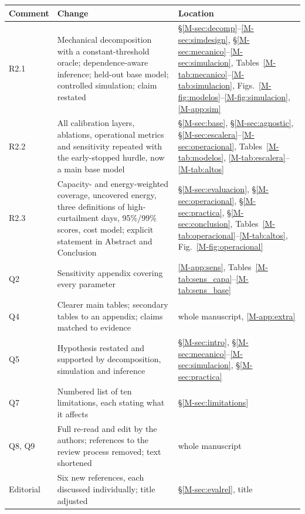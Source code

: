 \documentclass[11pt,a4paper]{article}
\begin{document}
\begin{center}
\small
\begin{tabularx}{\textwidth}{l >{\raggedright\arraybackslash}X >{\raggedright\arraybackslash}p{}}
\toprule
Comment & Change & Location \\
\midrule
R2.1 & Mechanical decomposition with a constant-threshold oracle; dependence-aware inference; held-out base model; controlled simulation; claim restated & \S\ref{M-sec:decomp}--\ref{M-sec:simdesign}, \S\ref{M-sec:mecanico}--\ref{M-sec:simulacion}, Tables~\ref{M-tab:mecanico}--\ref{M-tab:simulacion}, Figs.~\ref{M-fig:modelos}--\ref{M-fig:simulacion}, \ref{M-app:sim} \\
R2.2 & All calibration layers, ablations, operational metrics and sensitivity repeated with the early-stopped hurdle, now a main base model & \S\ref{M-sec:base}, \S\ref{M-sec:agnostic}, \S\ref{M-sec:escalera}--\ref{M-sec:operacional}, Tables~\ref{M-tab:modelos}, \ref{M-tab:escalera}--\ref{M-tab:altos} \\
R2.3 & Capacity- and energy-weighted coverage, uncovered energy, three definitions of high-curtailment days, 95\%/99\% scores, cost model; explicit statement in Abstract and Conclusion & \S\ref{M-sec:evaluacion}, \S\ref{M-sec:operacional}, \S\ref{M-sec:practica}, \S\ref{M-sec:conclusion}, Tables~\ref{M-tab:operacional}--\ref{M-tab:altos}, Fig.~\ref{M-fig:operacional} \\
Q2 & Sensitivity appendix covering every parameter & \ref{M-app:sens}, Tables~\ref{M-tab:sens_capa}--\ref{M-tab:sens_base} \\
Q4 & Clearer main tables; secondary tables to an appendix; claims matched to evidence & whole manuscript, \ref{M-app:extra} \\
Q5 & Hypothesis restated and supported by decomposition, simulation and inference & \S\ref{M-sec:intro}, \S\ref{M-sec:mecanico}--\ref{M-sec:simulacion}, \S\ref{M-sec:practica} \\
Q7 & Numbered list of ten limitations, each stating what it affects & \S\ref{M-sec:limitations} \\
Q8, Q9 & Full re-read and edit by the authors; references to the review process removed; text shortened & whole manuscript \\
Editorial & Six new references, each discussed individually; title adjusted & \S\ref{M-sec:evalrel}, title \\
\bottomrule
\end{tabularx}
\end{center}
\end{document}
